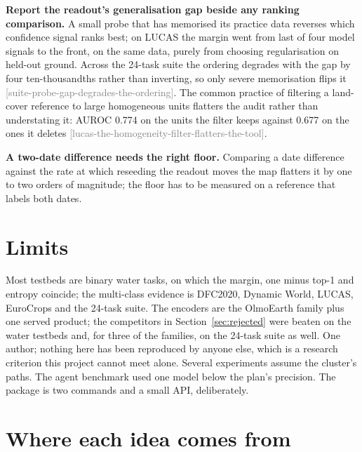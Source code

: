 \documentclass[11pt,a4paper]{article}
\newcommand{\claim}[1]{{\scriptsize\textsf{\textcolor{gray}{[#1]}}}}
\begin{document}
\textbf{Report the readout's generalisation gap beside any ranking comparison.} A
small probe that has memorised its practice data reverses which confidence
signal ranks best; on LUCAS the margin went from last of four model signals to
the front, on the same data, purely from choosing regularisation on held-out
ground. Across the 24-task suite the ordering degrades with the gap by four
ten-thousandths rather than inverting, so only severe memorisation flips it
\claim{suite-probe-gap-degrades-the-ordering}. The common practice of filtering a
land-cover reference to large homogeneous units flatters the audit rather than
understating it: AUROC 0.774 on the units the filter keeps against 0.677 on the
ones it deletes \claim{lucas-the-homogeneity-filter-flatters-the-tool}.

\textbf{A two-date difference needs the right floor.} Comparing a date difference
against the rate at which reseeding the readout moves the map flatters it by one
to two orders of magnitude; the floor has to be measured on a reference that
labels both dates.

\section{Limits}

Most testbeds are binary water tasks, on which the margin, one minus top-1 and
entropy coincide; the multi-class evidence is DFC2020, Dynamic World, LUCAS,
EuroCrops and the 24-task suite. The encoders are the OlmoEarth family plus one
served product; the competitors in Section~\ref{sec:rejected} were beaten on the water
testbeds and, for three of the families, on the 24-task suite as well. One author; nothing here has been reproduced by anyone else, which is a
research criterion this project cannot meet alone. Several experiments assume
the cluster's paths. The agent benchmark used one model below the plan's
precision. The package is two commands and a small API, deliberately.

\section{Where each idea comes from}
\label{sec:origins}
\end{document}
